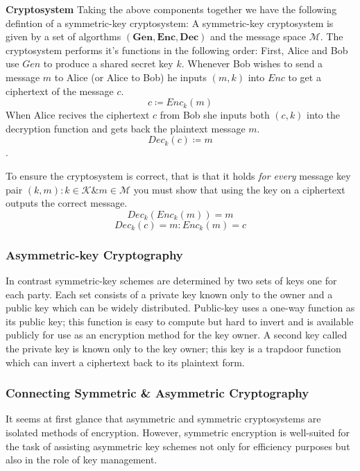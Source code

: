 \textbf{Cryptosystem}
\medskip
Taking the above components together we have the following defintion of a symmetric-key \gls{cryptosystem}:
\newline
A symmetric-key cryptosystem is given by a set of algorthms $\mathbf{(Gen, Enc, Dec)}$ and the message space $\mathcal{M}$.
\newline
The cryptosystem performs it's functions in the following order:
\newline
First, Alice and Bob use $Gen$ to produce a shared secret key $k$.
\newline
Whenever Bob wishes to send a message $m$ to Alice (or Alice to Bob) he inputs $(m,k)$ into $Enc$ to get a ciphertext of the message $c$.
$$c \coloneqq Enc_{k}(m)$$
\newline
When Alice recives the ciphertext $c$ from Bob she inputs both $(c,k)$ into the decryption function and gets back the plaintext message $m$.
$$Dec_{k}(c) \coloneqq m$$.
\medskip

To ensure the cryptosystem is correct, that is that it holds \textit{for every} message key pair $(k,m) : k \in \mathcal{K} \& m \in \mathcal{M}$ you must show that using the key on a ciphertext outputs the correct message. 
$$Dec_{k}(Enc_{k}(m)) = m$$
\newline
$$Dec_{k}(c) = m : Enc_{k}(m) = c$$



\subsubsection{Asymmetric-key Cryptography}
In contrast symmetric-key schemes are determined by two sets of keys one for each party. Each set consists of a private key known only to the owner and a public key which can be widely distributed.
Public-key uses a one-way function as its public key; this function is easy to compute but hard to invert and is available publicly for use as an encryption method for the key owner. A second key called the private key is known only to the key owner; this key is a trapdoor function which can invert a ciphertext back to its plaintext form.


 
\subsubsection{Connecting Symmetric \& Asymmetric Cryptography}
It seems at first glance that asymmetric and symmetric cryptosystems are isolated methods of encryption. However, symmetric encryption is well-suited for the task of assisting asymmetric key schemes not only for efficiency purposes but also in the role of key management. 